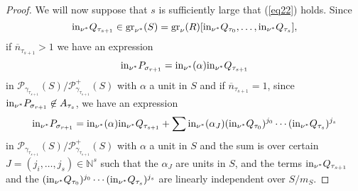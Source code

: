 \documentclass[11pt]{amsart}
\def\NZQ{\mathbb}               %
\def\NN{{\NZQ N}}
\begin{document}
\begin{proof}
 We will now suppose that $s$ is sufficiently large that (\ref{eq22}) holds.  Since 
 $$
 {\rm in}_{\nu^*}Q_{\tau_{s+1}}\in {\rm gr}_{\nu^*}(S)={\rm gr}_{\nu}(R)[{\rm in}_{\nu^*}Q_{\tau_0},\ldots,{\rm in}_{\nu^*}Q_{\tau_s}],
 $$
 if $\overline n_{\tau_{s+1}}>1$ we have an expression
 \begin{equation}\label{eqN2}
 {\rm in}_{\nu^*}P_{\sigma_{r+1}}={\rm in}_{\nu^*}(\alpha){\rm in}_{\nu^*}Q_{\tau_{s+1}}
 \end{equation}
 in $\mathcal P_{\gamma_{\tau_{s+1}}}(S)/\mathcal P^+_{\gamma_{\tau_{s+1}}}(S)$ with $\alpha$ a unit in $S$  and if $\overline n_{\tau_{s+1}}=1$, 
 since ${\rm in}_{\nu^*}P_{\sigma_{r+1}}\not\in A_{\tau_s}$, we have an expression 
 \begin{equation}\label{eqN3}
 {\rm in}_{\nu^*}P_{\sigma_{r+1}}={\rm in}_{\nu^*}(\alpha){\rm in}_{\nu^*}Q_{\tau_{s+1}}
 +\sum {\rm in}_{\nu^*}(\alpha_J)({\rm in}_{\nu^*}Q_{\tau_0})^{j_0}\cdots ({\rm in}_{\nu^*}Q_{\tau_s})^{j_s} 
 \end{equation}
 in $\mathcal P_{\gamma_{\tau_{s+1}}}(S)/\mathcal P^+_{\gamma_{\tau_{s+1}}}(S)$ with $\alpha$ a unit in $S$ and the sum is over certain $J=(j_i,\ldots,j_s)\in \NN^s$ such that the  $\alpha_J$  are units in $S$,   and the terms
${\rm in}_{\nu^*}Q_{\tau_{s+1}}$ and the $({\rm in}_{\nu^*}Q_{\tau_0})^{j_0}\cdots ({\rm in}_{\nu^*}Q_{\tau_s})^{j_s} $ are linearly independent over $S/m_S$. 
 

\end{proof}
\end{document}
